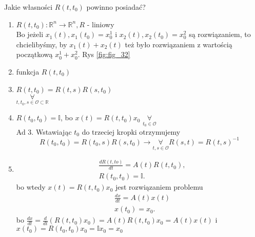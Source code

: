 \documentclass[../main.tex]{subfiles}
\begin{document}
\begin{definicja}
    Jakie własności $R(t,t_0)$ powinno posiadać?
    \begin{enumerate}
        \item $R(t,t_0): \mathbb{R}^n\to\mathbb{R}^n, R$ - liniowy\label{eq:131}\\
            Bo jeżeli $x_1(t), x_1(t_0)=x_0^1$ i $x_2(t),x_2(t_0) = x_0^2$ są rozwiązaniem, to chcielibyśmy, by  $x_1(t) + x_2(t)$ też było rozwiązaniem z wartością początkową $x_0^1+x_0^2$. Rys \ref{fig:fig_32}
        \item funkcja $R(t,t_0)$
        \item $R(t,t_0) = R(t,s) R(s,t_0)$\\
            $\underset{t,t_0,s\in\mathcal{O}\subset\mathbb{R}}{\forall} $
        \item $R(t_0,t_0) = \mathbb{I}$, bo $x(t) = R(t,t_0)x_0$
            $\underset{t_0\in\mathcal{O}}{\forall} $ \\
            Ad 3. Wstawiając $t_0$ do trzeciej kropki otrzymujemy
            \[
                R(t_0,t_0)=R(t_0,s)R(s,t_0)\rightarrow \underset{t,s\in\mathcal{O}}{\forall} R(s,t) = R(t,s)^{-1}
            \]
        \item
            \begin{align*}
                &\frac{dR(t,to)}{dt} = A(t)R(t,t_0),\\
                &R(t_0,t_0) = \mathbb{I}
            .\end{align*}
            bo wtedy
            $x(t) = R(t,t_0)x_0$ jest rozwiązaniem problemu
            \begin{align*}
                &\frac{dx}{dt}=A(t)x(t)\\
                &x(t_0)=x_0
            .\end{align*}
            bo $\frac{dx}{dt} = \frac{d}{dt}(R(t,t_0)x_0) = A(t)R(t,t_0)x_0=A(t)x(t)$ i $x(t_0)=R(t_0,t_0)x_0 = \mathbb{I}x_0 = x_0$
    \end{enumerate}
\end{definicja}
\end{document}
